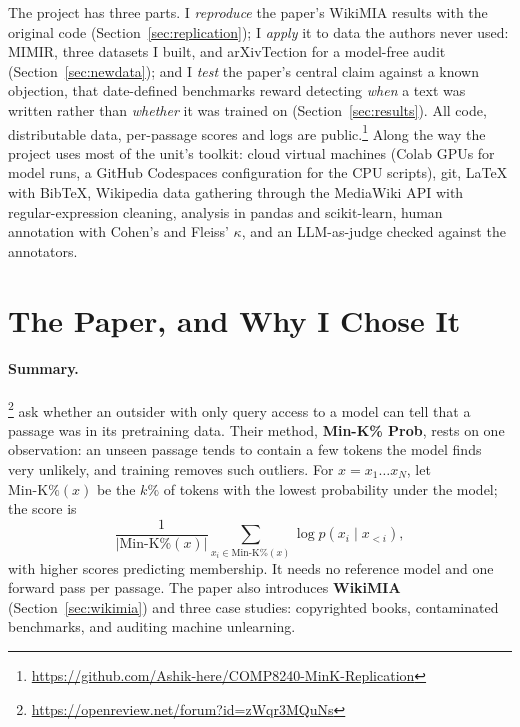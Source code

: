 \documentclass[11pt]{article}
\begin{document}
The project has three parts. I \emph{reproduce} the paper's WikiMIA results with the original code (Section~\ref{sec:replication}); I \emph{apply} it to data the authors never used: MIMIR, three datasets I built, and arXivTection for a model-free audit (Section~\ref{sec:newdata}); and I \emph{test} the paper's central claim against a known objection, that date-defined benchmarks reward detecting \emph{when} a text was written rather than \emph{whether} it was trained on \citep{duan2024membership,das2024blind} (Section~\ref{sec:results}). All code, distributable data, per-passage scores and logs are public.\footnote{\url{https://github.com/Ashik-here/COMP8240-MinK-Replication}} Along the way the project uses most of the unit's toolkit: cloud virtual machines (Colab GPUs for model runs, a GitHub Codespaces configuration for the CPU scripts), git, \LaTeX{} with BibTeX, Wikipedia data gathering through the MediaWiki API with regular-expression cleaning, analysis in pandas and scikit-learn, human annotation with Cohen's and Fleiss' $\kappa$, and an LLM-as-judge checked against the annotators.

\section{The Paper, and Why I Chose It}
\label{sec:paper}

\paragraph{Summary.} \citet{shi2024detecting}\footnote{\url{https://openreview.net/forum?id=zWqr3MQuNs}} ask whether an outsider with only query access to a model can tell that a passage was in its pretraining data. Their method, \textbf{Min-K\% Prob}, rests on one observation: an unseen passage tends to contain a few tokens the model finds very unlikely, and training removes such outliers. For $x=x_1\ldots x_N$, let $\mathrm{Min\text{-}K\%}(x)$ be the $k\%$ of tokens with the lowest probability under the model; the score is
\begin{equation}
\frac{1}{|\mathrm{Min\text{-}K\%}(x)|}\sum_{x_i\in\mathrm{Min\text{-}K\%}(x)}\log p(x_i\mid x_{<i}),
\end{equation}
with higher scores predicting membership. It needs no reference model and one forward pass per passage. The paper also introduces \textbf{WikiMIA} (Section~\ref{sec:wikimia}) and three case studies: copyrighted books, contaminated benchmarks, and auditing machine unlearning.
\end{document}
